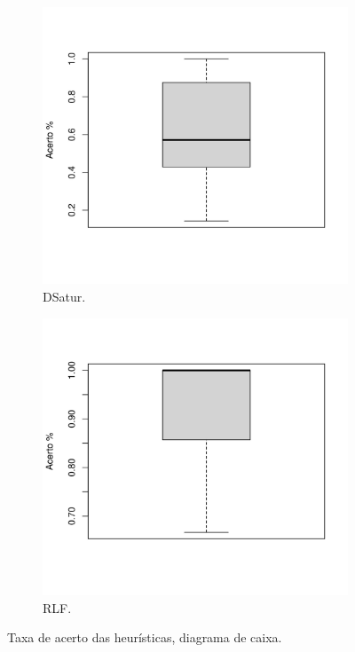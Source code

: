 \documentclass[12pt]{article}
\begin{document}
\begin{center}
\begin{figure}
\begin{subfigure}[b]{.49\linewidth}
\centering
\includegraphics[width=\linewidth/2]{bar-greedy-ac-d}
\caption{DSatur.}\label{fig:bar-greedy-ac-d}
\end{subfigure}
\begin{subfigure}[b]{.49\linewidth}
\centering
\includegraphics[width=\linewidth/2]{bar-greedy-ac-r}
\caption{RLF.}\label{fig:bar-greedy-ac-r}
\end{subfigure}
\caption{Taxa de acerto das heurísticas, diagrama de caixa.}\label{fig:barplot-greedy}
\end{figure}
\end{center}
\end{document}
